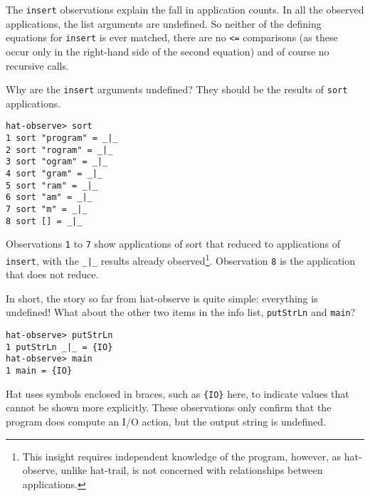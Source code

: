 \documentclass[12pt]{article}
\newcommand{\mkblue}[1]{#1}
\begin{document}
The {\tt insert} observations explain the fall in application counts.
In all the observed applications, the list arguments are undefined.
So neither of the defining equations for {\tt insert} is ever matched, 
there are no {\tt <=} comparisons (as these occur only in the right-hand
side of the second equation) and of course no recursive
calls.

Why are the {\tt insert} arguments undefined?  They should be the results of
{\tt sort} applications.
\begin{tabbing}
{\tt hat-observe> sort } \\
{\tt \mkblue{1} sort "program" = \verb"_|_" } \\
{\tt \mkblue{2} sort "rogram" = \verb"_|_" } \\
{\tt \mkblue{3} sort "ogram" = \verb"_|_" } \\
{\tt \mkblue{4} sort "gram" = \verb"_|_" } \\
{\tt \mkblue{5} sort "ram" = \verb"_|_" } \\
{\tt \mkblue{6} sort "am" = \verb"_|_" } \\
{\tt \mkblue{7} sort "m" = \verb"_|_" } \\
{\tt \mkblue{8} sort [] = \verb"_|_" }
\end{tabbing}
Observations {\tt 1} to {\tt 7} show applications of sort that
reduced to applications of {\tt insert}, with the {\tt \verb"_|_"} results
already observed\footnote{This insight requires independent knowledge
of the program, however,
as hat-observe, unlike hat-trail, is not concerned with
relationships between applications.}.
Observation {\tt 8} is the application that does not reduce.

In short, the story so far from hat-observe is quite simple: everything
is undefined!  What about the other two items in the
info list, {\tt putStrLn} and {\tt main}?
\begin{tabbing}
{\tt hat-observe> putStrLn } \\
{\tt \mkblue{1} putStrLn \verb"_|_" = \{IO\}} \\
{\tt hat-observe> main } \\
{\tt \mkblue{1} main = \{IO\}}
\end{tabbing}
Hat uses symbols enclosed in braces, such as {\tt \{IO\}} here,
to indicate values that cannot be shown more explicitly.
These observations only confirm that the program does compute
an I/O action, but the output string is undefined.
\end{document}
